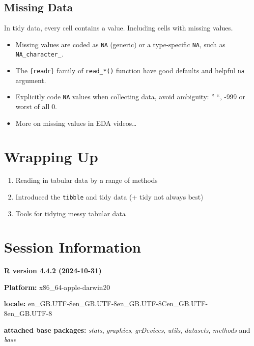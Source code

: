 \documentclass[
  letterpaper,
  DIV=11,
  numbers=noendperiod]{scrreprt}
\begin{document}
\subsection{Missing Data}\label{missing-data}

In tidy data, every cell contains a value. Including cells with missing
values.

\begin{itemize}
\item
  Missing values are coded as \texttt{NA} (generic) or a type-specific
  \texttt{NA}, such as \texttt{NA\_character\_}.
\item
  The \texttt{\{readr\}} family of \texttt{read\_*()} function have good
  defaults and helpful \texttt{na} argument.
\item
  Explicitly code \texttt{NA} values when collecting data, avoid
  ambiguity: '' ``, -999 or worst of all 0.
\item
  More on missing values in EDA videos\ldots{}
\end{itemize}

\section{Wrapping Up}\label{wrapping-up-1}

\begin{enumerate}
\def\labelenumi{\arabic{enumi}.}
\item
  Reading in tabular data by a range of methods
\item
  Introduced the \texttt{tibble} and tidy data (+ tidy not always best)
\item
  Tools for tidying messy tabular data
\end{enumerate}

\section{Session Information}\label{session-information-3}

\textbf{R version 4.4.2 (2024-10-31)}

\textbf{Platform:} x86\_64-apple-darwin20

\textbf{locale:}
en\_GB.UTF-8\textbar\textbar en\_GB.UTF-8\textbar\textbar en\_GB.UTF-8\textbar\textbar C\textbar\textbar en\_GB.UTF-8\textbar\textbar en\_GB.UTF-8

\textbf{attached base packages:} \emph{stats}, \emph{graphics},
\emph{grDevices}, \emph{utils}, \emph{datasets}, \emph{methods} and
\emph{base}
\end{document}
